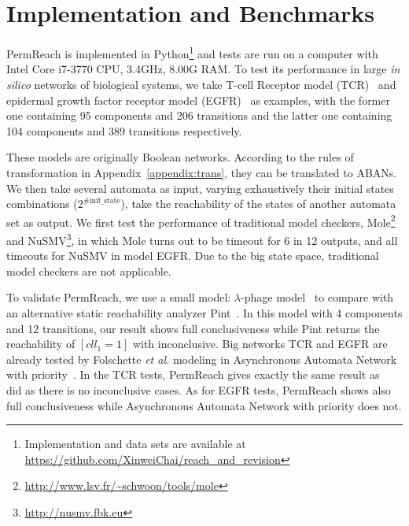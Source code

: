 \documentclass[runningheads]{llncs}
\begin{document}

\section{Implementation and Benchmarks}\label{sect:5}
PermReach is implemented in Python\footnote{Implementation and data sets are available at \url{https://github.com/XinweiChai/reach_and_revision}} and tests are run on a computer with Intel Core i7-3770 CPU, \@3.4GHz, 8.00G RAM. 
To test its performance in large \textit{in silico} networks of biological systems, we take T-cell Receptor model (TCR)~\cite{saez2007logical} and epidermal growth factor receptor model (EGFR)~\cite{samaga2009logic} as examples, with the former one containing 95 components and 206 transitions and the latter one containing 104 components and 389 transitions respectively. 

These models are originally Boolean networks.
According to the rules of transformation in Appendix~\ref{appendix:trans}, they can be translated to ABANs. We then take several automata as input, varying exhaustively their initial states combinations ($2^{\mathrm{\#init\_state}}$), take the reachability of the states of another automata set as output.
We first test the performance of traditional model checkers, Mole\footnote{\url{http://www.lsv.fr/~schwoon/tools/mole}} and NuSMV\footnote{\url{http://nusmv.fbk.eu}}, in which Mole turns out to be timeout for 6 in 12 outputs, and all timeouts for NuSMV in model EGFR.
Due to the big state space, traditional model checkers are not applicable. 

To validate PermReach, we use a small model: $\lambda$-phage model~\cite{thieffry1995dynamical} to compare with an alternative static reachability analyzer Pint~\cite{pauleve2012}. In this model with 4 components and 12 transitions, our result shows full conclusiveness while Pint returns the reachability of $[cll_1=1]$ with inconclusive.
Big networks TCR and EGFR are already tested by Folschette \textit{et al.} modeling in Asynchronous Automata Network with priority~\cite{folschette2015}. 
In the TCR tests, PermReach gives exactly the same result as~\cite{folschette2015} did as there is no inconclusive cases. As for EGFR tests, PermReach shows also full conclusiveness while Asynchronous Automata Network with priority does not.
\end{document}
